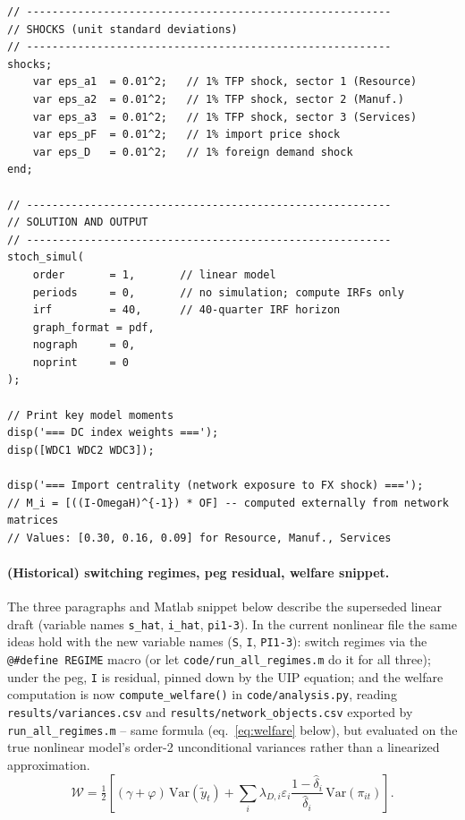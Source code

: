 \documentclass[11pt,a4paper]{article}
\newcommand{\wh}[1]{\widehat{#1}}
\providecommand{\tl}[1]{\widetilde{#1}}
\begin{document}
\begin{lstlisting}[caption={Superseded: original hand-linearized draft},label={lst:dynare-old}]
// ---------------------------------------------------------
// SHOCKS (unit standard deviations)
// ---------------------------------------------------------
shocks;
    var eps_a1  = 0.01^2;   // 1% TFP shock, sector 1 (Resource)
    var eps_a2  = 0.01^2;   // 1% TFP shock, sector 2 (Manuf.)
    var eps_a3  = 0.01^2;   // 1% TFP shock, sector 3 (Services)
    var eps_pF  = 0.01^2;   // 1% import price shock
    var eps_D   = 0.01^2;   // 1% foreign demand shock
end;

// ---------------------------------------------------------
// SOLUTION AND OUTPUT
// ---------------------------------------------------------
stoch_simul(
    order       = 1,       // linear model
    periods     = 0,       // no simulation; compute IRFs only
    irf         = 40,      // 40-quarter IRF horizon
    graph_format = pdf,
    nograph     = 0,
    noprint     = 0
);

// Print key model moments
disp('=== DC index weights ===');
disp([WDC1 WDC2 WDC3]);

disp('=== Import centrality (network exposure to FX shock) ===');
// M_i = [((I-OmegaH)^{-1}) * OF] -- computed externally from network matrices
// Values: [0.30, 0.16, 0.09] for Resource, Manuf., Services
\end{lstlisting}

\paragraph{(Historical) switching regimes, peg residual, welfare snippet.}
The three paragraphs and Matlab snippet below describe the superseded
linear draft (variable names \texttt{s\_hat}, \texttt{i\_hat}, \texttt{pi1-3}).
In the current nonlinear file the same ideas hold with the new variable
names (\texttt{S}, \texttt{I}, \texttt{PI1-3}): switch regimes via the
\texttt{@\#define REGIME} macro (or let
\texttt{code/run\_all\_regimes.m} do it for all three); under the peg,
\texttt{I} is residual, pinned down by the UIP equation; and the
welfare computation is now \texttt{compute\_welfare()} in
\texttt{code/analysis.py}, reading \texttt{results/variances.csv} and
\texttt{results/network\_objects.csv} exported by
\texttt{run\_all\_regimes.m} -- same formula
(eq.~\ref{eq:welfare} below), but evaluated on the true nonlinear
model's order-2 unconditional variances rather than a linearized
approximation.
\begin{equation}
\mathcal{W}=\tfrac{1}{2}\!\left[(\gamma+\varphi)\,\text{Var}(\tl y_t)
+\sum_i\lambda_{D,i}\varepsilon_i\frac{1-\wh\delta_i}{\wh\delta_i}\,\text{Var}(\pi_{it})\right].
\label{eq:welfare}
\end{equation}
\end{document}
